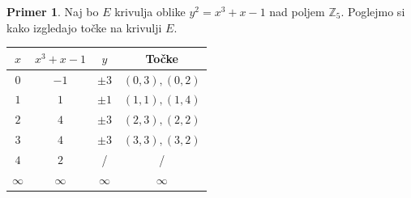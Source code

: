 \documentclass[12pt,a4paper,twoside]{article}
\theoremstyle{definition} %
\newtheorem{primer}[definicija]{Primer}
\theoremstyle{plain} %
\numberwithin{equation}{section}  %
\newcommand{\Z}{\mathbb Z}
\begin{document}
\begin{primer}

Naj bo $E$ krivulja oblike $y^2 = x^3+x-1$ nad poljem $\Z_5$. Poglejmo si kako izgledajo točke na krivulji $E$.

\begin{table}[H]
\centering
\begin{tabular}{c|c|c|c}
$x$      & $x^3+x-1$ & $y$      & Točke         \\ \hline
$0$      & $-1$      & $\pm 3$  & $(0,3),(0,2)$ \\
$1$      & $1$       & $\pm 1$  & $(1,1),(1,4)$ \\
$2$      & $4$       & $\pm 3$  & $(2,3),(2,2)$ \\
$3$      & $4$       & $\pm 3$  & $(3,3),(3,2)$ \\
$4$      & $2$       & /        & /             \\
$\infty$ & $\infty$  & $\infty$ & $\infty$     
\end{tabular}
\end{table}


\end{primer}
\end{document}
